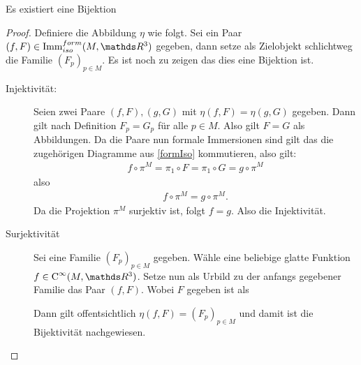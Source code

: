 \begin{Lem}
  Es existiert eine Bijektion
	
  \begin{proof}
    Definiere die Abbildung $ \eta $ wie folgt. Sei ein Paar
    $ (f,F) \in \Immfi{M}{\R^3}$ gegeben, dann setze als Zielobjekt
    schlichtweg die Familie $ (F_p)_{p\in M} $. Es ist noch zu zeigen
    das dies eine Bijektion ist.
    \begin{description}
    \item[Injektivität:] Seien zwei Paare $ (f,F),(g,G) $ mit
      $ \eta(f,F)=\eta(g,G) $ gegeben. Dann gilt nach Definition
      $ F_p = G_p $ für alle $ p\in M $. Also gilt $ F=G $ als
      Abbildungen. Da die Paare nun formale Immersionen sind gilt das
      die zugehörigen Diagramme aus \cref{formIso} kommutieren, also
      gilt:
      \begin{gather*}
        f \circ \pi^M = \pi_1 \circ F = \pi_1 \circ G = g \circ \pi^M
      \end{gather*}
      also
      \begin{gather*}
        f \circ \pi^M = g \circ \pi^M.
      \end{gather*}  Da die Projektion $ \pi^M $ surjektiv ist, folgt
      $ f=g $.  Also die Injektivität.
    \item[Surjektivität] Sei eine Familie $ (F_p)_{p\in M} $
      gegeben. Wähle eine beliebige glatte Funktion
      $ f\in \Cinfty{M}{\R^3} $. Setze nun als Urbild zu der anfangs
      gegebener Familie das Paar $ (f,F) $. Wobei $ F $ gegeben ist als
			 
      Dann gilt offentsichtlich $ \eta(f,F)=(F_p)_{p\in M} $ und damit
      ist die Bijektivität nachgewiesen.
    \end{description}
  \end{proof}
\end{Lem}

